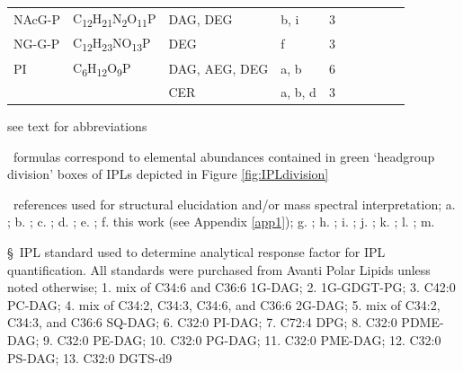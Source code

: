 {\begin{landscape}
\begin{table}
\begin{adjustbox}{width=\textheight,keepaspectratio}
\begin{threeparttable}
\begin{tabular}{lrllcrrrrr}
NAcG-P & \multicolumn{1}{l}{C\textsubscript{12}H\textsubscript{21}N\textsubscript{2}O\textsubscript{11}P} & DAG, DEG & b, i  & 3     &       &       &       &       &  \\
NG-G-P & \multicolumn{1}{l}{C\textsubscript{12}H\textsubscript{23}NO\textsubscript{13}P} & DEG   & f     & 3     &       &       &       &       &  \\
PI    & \multicolumn{1}{l}{C\textsubscript{6}H\textsubscript{12}O\textsubscript{9}P} & DAG, AEG, DEG & a, b  & 6     &       &       &       &       &  \\
      &       & CER   & a, b, d & 3     &       &       &       &       &  \\
\bottomrule
\end{tabular}%


\begin{tablenotes}
\small
\item * see text for abbreviations
\item \dag~formulas correspond to elemental abundances contained in green `headgroup division' boxes of IPLs depicted in Figure \ref{fig:IPLdivision}
\item \ddag~references used for structural elucidation and/or mass spectral interpretation; a. \cite{Sturt_Intact_2004}; b. \cite{schubotz2013spatial}
; c. \cite{Yoshinaga_Systematic_2011}; d. \cite{karlsson1998molecular}; e. \cite{ferreira1999characterization}; f. this work (see Appendix \ref{app1}); g. \cite{diercks2015accumulation}; h. \cite{schubotz2015stable}; i. \cite{yang2006structural}; j. \cite{wang2015improved}; k. \cite{benning1995accumulation}; l. \cite{zhang2009characterization}; m. \cite{moore2013novel}
\item \S~IPL standard used to determine analytical response factor for IPL quantification. All standards were purchased from Avanti Polar Lipids unless noted otherwise; 1. mix of C34:6 and C36:6 1G-DAG; 2. 1G-GDGT-PG; 3. C42:0 PC-DAG; 4. mix of C34:2, C34:3, C34:6, and C36:6 2G-DAG; 5. mix of C34:2, C34:3, and C36:6 SQ-DAG; 6. C32:0 PI-DAG; 7. C72:4 DPG; 8. C32:0 PDME-DAG; 9. C32:0 PE-DAG; 10. C32:0 PG-DAG; 11. C32:0 PME-DAG; 12. C32:0 PS-DAG; 13. C32:0 DGTS-d9
\normalsize
\end{tablenotes}

  \label{tab:IPL}
  \end{threeparttable}
  \end{adjustbox}
\end{table}

\end{landscape}
\doublespace
}

